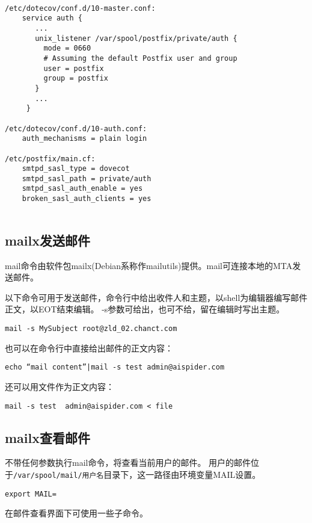 \begin{verbatim}

/etc/dotecov/conf.d/10-master.conf:
    service auth {
       ...
       unix_listener /var/spool/postfix/private/auth {
         mode = 0660
         # Assuming the default Postfix user and group
         user = postfix
         group = postfix        
       }
       ...
     }
 
/etc/dotecov/conf.d/10-auth.conf:
    auth_mechanisms = plain login

/etc/postfix/main.cf:
    smtpd_sasl_type = dovecot
    smtpd_sasl_path = private/auth
    smtpd_sasl_auth_enable = yes
    broken_sasl_auth_clients = yes
    
\end{verbatim}



\subsection{mailx发送邮件}

mail命令由软件包mailx(Debian系称作mailutils)提供。mail可连接本地的MTA发送邮件。

以下命令可用于发送邮件，命令行中给出收件人和主题，以shell为编辑器编写邮件正文，以EOT结束编辑。 
-s参数可给出，也可不给，留在编辑时写出主题。
\begin{verbatim}
mail -s MySubject root@zld_02.chanct.com
\end{verbatim}

也可以在命令行中直接给出邮件的正文内容：
\begin{verbatim}
echo “mail content”|mail -s test admin@aispider.com 
\end{verbatim}

还可以用文件作为正文内容：
\begin{verbatim}
mail -s test  admin@aispider.com < file
\end{verbatim}


\subsection{mailx查看邮件}
不带任何参数执行mail命令，将查看当前用户的邮件。
用户的邮件位于\verb|/var/spool/mail/用户名|目录下，这一路径由环境变量MAIL设置。
\begin{verbatim}
export MAIL=
\end{verbatim}

在邮件查看界面下可使用一些子命令。

